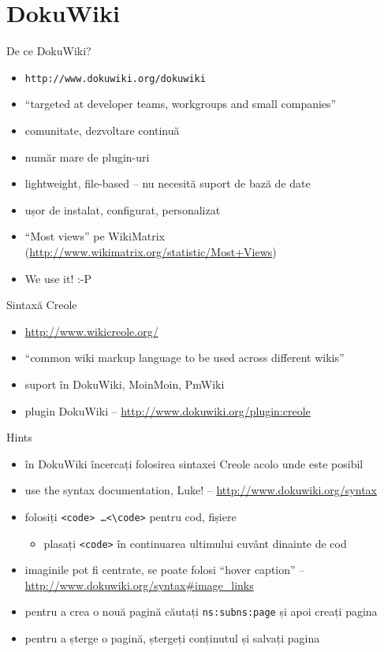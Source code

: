 \documentclass{beamer}
\begin{document}
\section{DokuWiki}

\frame{\tableofcontents[currentsection]}

\begin{frame}{De ce DokuWiki?}
  \begin{itemize}
    \item \texttt{http://www.dokuwiki.org/dokuwiki}
    \item ``targeted at developer teams, workgroups and small companies''
    \item comunitate, dezvoltare continuă
    \item număr mare de plugin-uri
    \item lightweight, file-based -- nu necesită suport de bază de date
    \item ușor de instalat, configurat, personalizat
    \item ``Most views'' pe WikiMatrix
(\url{http://www.wikimatrix.org/statistic/Most+Views})
    \item We use it! :-P
  \end{itemize}
\end{frame}

\begin{frame}{Sintaxă Creole}
  \begin{itemize}
    \item \url{http://www.wikicreole.org/}
    \item ``common wiki markup language to be used across different wikis''
    \item suport în DokuWiki, MoinMoin, PmWiki
    \item plugin DokuWiki -- \url{http://www.dokuwiki.org/plugin:creole}
  \end{itemize}
\end{frame}

\begin{frame}{Hints}
  \begin{itemize}
    \item în DokuWiki încercați folosirea sintaxei Creole acolo unde este
posibil
    \item use the syntax documentation, Luke! --
\url{http://www.dokuwiki.org/syntax}
    \item folosiți \texttt{<code> \ldots <\textbackslash{}code>} pentru cod,
fișiere
      \begin{itemize}
        \item plasați \texttt{<code>} în continuarea ultimului cuvânt
dinainte de cod
      \end{itemize}
    \item imaginile pot fi centrate, se poate folosi ``hover caption'' --
\url{http://www.dokuwiki.org/syntax\#image\_links}
    \item pentru a crea o nouă pagină căutați \texttt{ns:subns:page} și apoi
creați pagina
    \item pentru a șterge o pagină, ștergeți conținutul și salvați pagina
  \end{itemize}
\end{frame}
\end{document}
